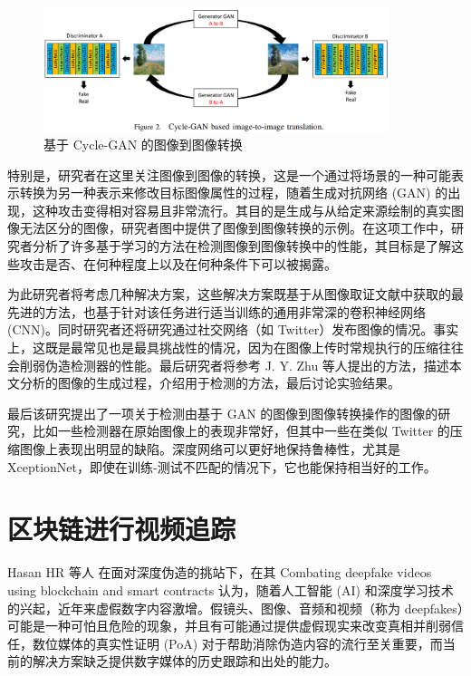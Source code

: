 \begin{figure}[htb]
\centering 
\includegraphics[width=0.90\textwidth]{img/p6m2.png} 
\caption{基于 Cycle-GAN 的图像到图像转换}
\label{Test}
\end{figure}

特别是，研究者在这里关注图像到图像的转换，这是一个通过将场景的一种可能表示转换为另一种表示来修改目标图像属性的过程，随着生成对抗网络 (GAN) 的出现，这种攻击变得相对容易且非常流行。其目的是生成与从给定来源绘制的真实图像无法区分的图像，研究者图中提供了图像到图像转换的示例。在这项工作中，研究者分析了许多基于学习的方法在检测图像到图像转换中的性能，其目标是了解这些攻击是否、在何种程度上以及在何种条件下可以被揭露。

为此研究者将考虑几种解决方案，这些解决方案既基于从图像取证文献中获取的最先进的方法，也基于针对该任务进行适当训练的通用非常深的卷积神经网络 (CNN)。同时研究者还将研究通过社交网络（如 Twitter）发布图像的情况。事实上，这既是最常见也是最具挑战性的情况，因为在图像上传时常规执行的压缩往往会削弱伪造检测器的性能。最后研究者将参考 J. Y. Zhu 等人提出的方法，描述本文分析的图像的生成过程，介绍用于检测的方法，最后讨论实验结果。

最后该研究提出了一项关于检测由基于 GAN 的图像到图像转换操作的图像的研究，比如一些检测器在原始图像上的表现非常好，但其中一些在类似 Twitter 的压缩图像上表现出明显的缺陷。深度网络可以更好地保持鲁棒性，尤其是 XceptionNet，即使在训练-测试不匹配的情况下，它也能保持相当好的工作。

\section{区块链进行视频追踪}

Hasan HR 等人 \cite{hasan2019combating} 在面对深度伪造的挑站下，在其 Combating deepfake videos using blockchain and smart contracts 认为，随着人工智能 (AI) 和深度学习技术的兴起，近年来虚假数字内容激增。假镜头、图像、音频和视频（称为 deepfakes）可能是一种可怕且危险的现象，并且有可能通过提供虚假现实来改变真相并削弱信任，数位媒体的真实性证明 (PoA) 对于帮助消除伪造内容的流行至关重要，而当前的解决方案缺乏提供数字媒体的历史跟踪和出处的能力。

